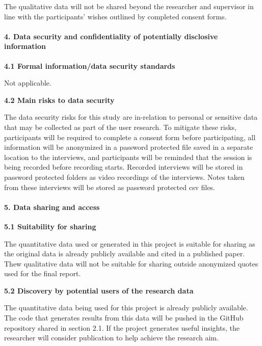 \documentclass[
]{article}
\begin{document}
The qualitative data will not be shared beyond the researcher and
supervisor in line with the participants' wishes outlined by completed
consent forms.

\hypertarget{data-security-and-confidentiality-of-potentially-disclosive-information}{%
\paragraph{4. Data security and confidentiality of potentially
disclosive
information}\label{data-security-and-confidentiality-of-potentially-disclosive-information}}

\textbf{4.1 Formal information/data security standards}

Not applicable.

\textbf{4.2 Main risks to data security}

The data security risks for this study are in-relation to personal or
sensitive data that may be collected as part of the user research. To
mitigate these risks, participants will be required to complete a
consent form before participating, all information will be anonymized in
a password protected file saved in a separate location to the
interviews, and participants will be reminded that the session is being
recorded before recording starts. Recorded interviews will be stored in
password protected folders as video recordings of the interviews. Notes
taken from these interviews will be stored as password protected csv
files.

\hypertarget{data-sharing-and-access}{%
\paragraph{5. Data sharing and access}\label{data-sharing-and-access}}

\textbf{5.1 Suitability for sharing}

The quantitative data used or generated in this project is suitable for
sharing as the original data is already publicly available and cited in
a published paper. Thew qualitative data will not be suitable for
sharing outside anonymized quotes used for the final report.

\textbf{5.2 Discovery by potential users of the research data}

The quantitative data being used for this project is already publicly
available. The code that generates results from this data will be pushed
in the GitHub repository shared in section 2.1. If the project generates
useful insights, the researcher will consider publication to help
achieve the research aim.
\end{document}
